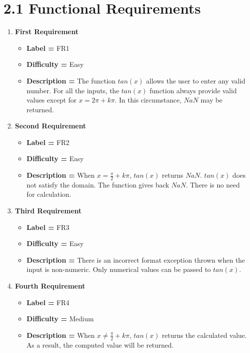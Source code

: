 \documentclass[12pt]{article}
\begin{document}
\section*{2.1 Functional Requirements}
\begin{enumerate}
        \item \textbf{First Requirement}
        \begin{itemize}
            \item \textbf{Label = } FR1
            \item\textbf{Difficulty = } Easy
            \item\textbf{Description = } The function $tan(x)$ allows the user to enter any valid number. For all the inputs, the $tan(x)$ function always provide valid values except for 
            $x = 2\pi + k\pi$. In this circumstance, $NaN$ may be returned.
        \end{itemize}

\item \textbf{Second Requirement}
        \begin{itemize}
            \item \textbf{Label = } FR2
            \item\textbf{Difficulty = } Easy
            \item\textbf{Description = } When $ x = \frac{\pi}{2} + k\pi$, $tan(x)$ returns $NaN$. $tan(x)$ does not satisfy the domain. The function gives back $NaN$. There is no need for calculation.
        
        \end{itemize}
        \item \textbf{Third Requirement}
        \begin{itemize}
            \item \textbf{Label = } FR3
            \item\textbf{Difficulty = } Easy
            \item\textbf{Description = } There is an incorrect format exception thrown when the input is non-numeric. Only numerical values can be passed to $tan(x)$. 
        \end{itemize}
        
        
        \item \textbf{Fourth Requirement}
        \begin{itemize}
            \item \textbf{Label = } FR4
            \item\textbf{Difficulty = } Medium
            \item\textbf{Description = } When $ x \neq \frac{\pi}{2} + k\pi$, $tan(x)$ returns the calculated value. As a result, the computed value will be returned.
        \end{itemize}
    \end{enumerate}
\end{document}
